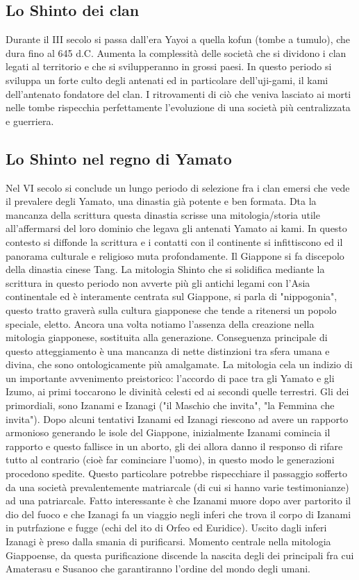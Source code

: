 \documentclass[10pt,a4paper]{report}
\begin{document}
\subsection{Lo Shinto dei clan}
Durante il III secolo si passa dall'era Yayoi a quella kofun (tombe a tumulo), che dura fino al 645 d.C. Aumenta la complessità delle società che si dividono i clan legati al territorio e che si svilupperanno in grossi paesi. In questo periodo si sviluppa un forte culto degli antenati ed in particolare dell'uji-gami, il kami dell'antenato fondatore del clan. I ritrovamenti di ciò che veniva lasciato ai morti nelle tombe rispecchia perfettamente l'evoluzione di una società più centralizzata e guerriera. 
\subsection{Lo Shinto nel regno di Yamato}
Nel VI secolo si conclude un lungo periodo di selezione fra i clan emersi che vede il prevalere degli Yamato, una dinastia già potente e ben formata. Dta la mancanza della scrittura questa dinastia scrisse una mitologia/storia utile all'affermarsi del loro dominio che legava gli antenati Yamato ai kami. In questo contesto si diffonde la scrittura e i contatti con il continente si infittiscono ed il panorama culturale e religioso muta profondamente. Il Giappone si fa discepolo della dinastia cinese Tang. La mitologia Shinto che si solidifica mediante la scrittura in questo periodo non avverte più gli antichi legami con l'Asia continentale ed è interamente centrata sul Giappone, si parla di "nippogonia", questo tratto graverà sulla cultura giapponese che tende a ritenersi un popolo speciale, eletto. Ancora una volta notiamo l'assenza della creazione nella mitologia giapponese, sostituita alla generazione. Conseguenza principale di questo atteggiamento è una mancanza di nette distinzioni tra sfera umana e divina, che sono ontologicamente più amalgamate. La mitologia cela un indizio di un importante avvenimento preistorico: l'accordo di pace tra gli Yamato e gli Izumo, ai primi toccarono le divinità celesti ed ai secondi quelle terrestri. Gli dei primordiali, sono Izanami e Izanagi ("il Maschio che invita", "la Femmina che invita"). Dopo alcuni tentativi Izanami ed Izanagi riescono ad avere un rapporto armonioso generando le isole del Giappone, inizialmente Izanami comincia il rapporto e questo fallisce in un aborto, gli dei allora danno il responso di rifare tutto al contrario (cioè far cominciare l'uomo), in questo modo le generazioni procedono spedite. Questo particolare potrebbe rispecchiare il passaggio sofferto da una società prevalentemente matriarcale (di cui si hanno varie testimonianze) ad una patriarcale. Fatto interessante è che Izanami muore dopo aver partorito il dio del fuoco e che Izanagi fa un viaggio negli inferi che trova il corpo di Izanami in putrfazione e fugge (echi del ito di Orfeo ed Euridice). Uscito dagli inferi Izanagi è preso dalla smania di purificarsi. Momento centrale nella mitologia Giappoense, da questa purificazione discende la nascita degli dei principali fra cui Amaterasu e Susanoo che garantiranno l'ordine del mondo degli umani. 
\end{document}
